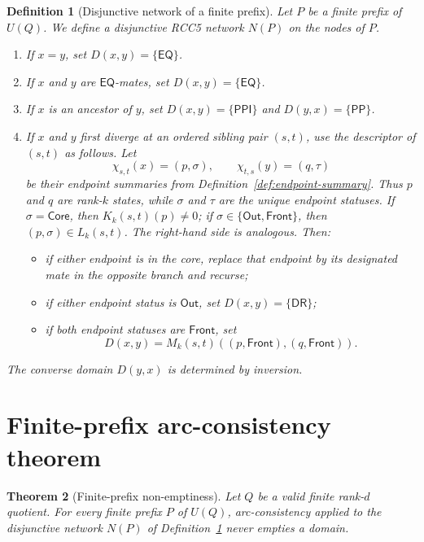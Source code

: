 \documentclass[11pt]{article}
\newtheorem{definition}{Definition}[section]
\newtheorem{theorem}[definition]{Theorem}
\theoremstyle{remark}
\newcommand{\DR}{\mathsf{DR}}
\newcommand{\PP}{\mathsf{PP}}
\newcommand{\PPI}{\mathsf{PPI}}
\newcommand{\EQ}{\mathsf{EQ}}
\newcommand{\Core}{\mathsf{Core}}
\newcommand{\Out}{\mathsf{Out}}
\newcommand{\Front}{\mathsf{Front}}
\begin{document}
\begin{definition}[Disjunctive network of a finite prefix]\label{def:network}
Let $P$ be a finite prefix of $U(Q)$. We define a disjunctive RCC5 network $N(P)$ on the nodes of $P$.
\begin{enumerate}[label=(\roman*)]
    \item If $x=y$, set $D(x,y)=\{\EQ\}$.
    \item If $x$ and $y$ are $\EQ$-mates, set $D(x,y)=\{\EQ\}$.
    \item If $x$ is an ancestor of $y$, set $D(x,y)=\{\PPI\}$ and $D(y,x)=\{\PP\}$.
    \item If $x$ and $y$ first diverge at an ordered sibling pair $(s,t)$, use the descriptor of $(s,t)$ as follows. Let
    \[
    \chi_{s,t}(x)=(p,\sigma),\qquad \chi_{t,s}(y)=(q,\tau)
    \]
    be their endpoint summaries from Definition~\ref{def:endpoint-summary}. Thus $p$ and $q$ are rank-$k$ states, while $\sigma$ and $\tau$ are the unique endpoint statuses. If $\sigma=\Core$, then $K_k(s,t)(p)\neq 0$; if $\sigma\in\{\Out,\Front\}$, then $(p,\sigma)\in L_k(s,t)$. The right-hand side is analogous.
    Then:
    \begin{itemize}
        \item if either endpoint is in the core, replace that endpoint by its designated mate in the opposite branch and recurse;
        \item if either endpoint status is $\Out$, set $D(x,y)=\{\DR\}$;
        \item if both endpoint statuses are $\Front$, set
        \[
        D(x,y)=M_k(s,t)((p,\Front),(q,\Front)).
        \]
    \end{itemize}
\end{enumerate}
The converse domain $D(y,x)$ is determined by inversion.
\end{definition}

\section{Finite-prefix arc-consistency theorem}

\begin{theorem}[Finite-prefix non-emptiness]\label{thm:finite-prefix}
Let $Q$ be a valid finite rank-$d$ quotient. For every finite prefix $P$ of $U(Q)$, arc-consistency applied to the disjunctive network $N(P)$ of Definition~\ref{def:network} never empties a domain.
\end{theorem}
\end{document}
